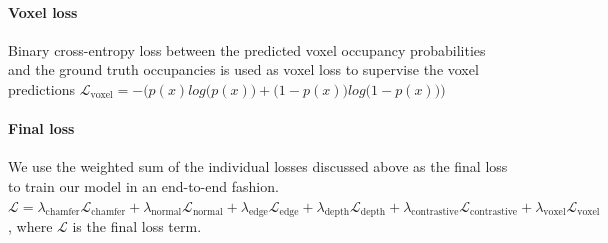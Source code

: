 \paragraph{Voxel loss} Binary cross-entropy loss between the predicted voxel occupancy probabilities and the ground truth occupancies is used as voxel loss to supervise the voxel predictions
$\mathcal{L}_{\text{voxel}} = -{\Big(p(x) log\big(p(x)\big) + \big(1 - p(x)\big)log\big(1 - p(x)\big)\Big)}$

\paragraph{Final loss} We use the weighted sum of the individual losses discussed above as the final loss to train our model in an end-to-end fashion.
$\mathcal{L} = \lambda_{\text{chamfer}}\mathcal{L}_{\text{chamfer}} + \lambda_{\text{normal}}\mathcal{L}_{\text{normal}} + \lambda_{\text{edge}}\mathcal{L}_{\text{edge}} + \lambda_{\text{depth}}\mathcal{L}_{\text{depth}} + \lambda_{\text{contrastive}}\mathcal{L}_{\text{contrastive}} + \lambda_{\text{voxel}}\mathcal{L}_{\text{voxel}}$
, where $\mathcal{L}$ is the final loss term.

